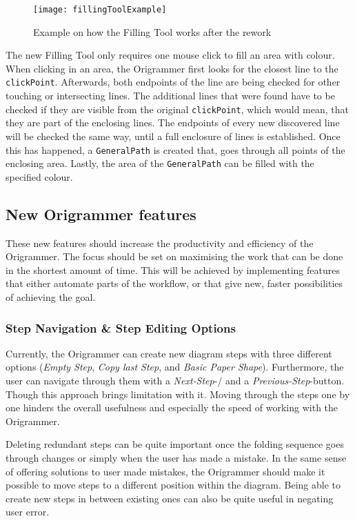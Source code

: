 \begin{figure}[htbp]
	\centering
	\texttt{[image: fillingToolExample]}
	\caption{Example on how the Filling Tool works after the rework}
	\label{fig:fillingToolExample}
\end{figure}
The new Filling Tool only requires one mouse click to fill an area with colour. When clicking in an area, the Origrammer first looks for the closest line to the \texttt{clickPoint}. Afterwards, both endpoints of the line are being checked for other touching or intersecting lines. The additional lines that were found have to be checked if they are visible from the original \texttt{clickPoint}, which would mean, that they are part of the enclosing lines. The endpoints of every new discovered line will be checked the same way, until a full enclosure of lines is established. Once this has happened, a \texttt{GeneralPath} is created that, goes through all points of the enclosing area. Lastly, the area of the \texttt{GeneralPath} can be filled with the specified colour.


\subsection{New Origrammer features}

These new features should increase the productivity and efficiency of the Origrammer. The focus should be set on maximising the work that can be done in the shortest amount of time. This will be achieved by implementing features that either automate parts of the workflow, or that give new, faster possibilities of achieving the goal.

\subsubsection{Step Navigation \& Step Editing Options}

Currently, the Origrammer can create new diagram steps with three different options (\emph{Empty Step}, \emph{Copy last Step}, and \emph{Basic Paper Shape}). Furthermore, the user can navigate through them with a \emph{Next-Step}-/ and a \emph{Previous-Step}-button. Though this approach brings limitation with it. Moving through the steps one by one hinders the overall usefulness and especially the speed of working with the Origrammer.

Deleting redundant steps can be quite important once the folding sequence goes through changes or simply when the user has made a mistake. In the same sense of offering solutions to user made mistakes, the Origrammer should make it possible to move steps to a different position within the diagram. Being able to create new steps in between existing ones can also be quite useful in negating user error.

